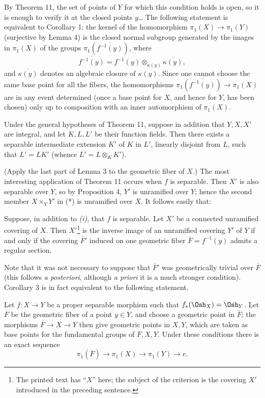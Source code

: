 By Theorem 11, the set of points of $Y$ for which this condition holds is open,
so it is enough to verify it at the closed points $y$\ldots{} The following
statement is equivalent to Corollary 1: the kernel of the homomorphism
$\pi_1(X)\longrightarrow\pi_1(Y)$ (surjective by Lemma 4) is the closed normal
subgroup generated by the images in $\pi_1(X)$ of the groups
$\pi_1(\overline{f^{-1}(y)})$, where
\[
  \overline{f^{-1}(y)}
  =f^{-1}(y)\otimes_{\kappa(y)}\overline{\kappa(y)},
\]
and $\overline{\kappa(y)}$ denotes an algebraic closure of $\kappa(y)$. Since
one cannot choose the same base point for all the fibers, the homomorphisms
$\pi_1(\overline{f^{-1}(y)})\longrightarrow\pi_1(X)$ are in any event
determined (once a base point for $X$, and hence for $Y$, has been chosen) only
up to composition with an inner automorphism of $\pi_1(X)$.

 Under the general hypotheses of Theorem 11, suppose in
addition that $Y,X,X'$ are integral, and let $K,L,L'$ be their function fields.
Then there exists a separable intermediate extension $K'$ of $K$ in $L'$,
linearly disjoint from $L$, such that $L'=LK'$ (whence
$L'=L\otimes_K K'$).

(Apply the last part of Lemma 3 to the geometric fiber of $X$.) The most
interesting application of Theorem 11 occurs when $f$ is separable. Then $X'$
is also separable over $Y$, so by Proposition 4, $Y'$ is unramified over $Y$;
hence the second member $X\times_Y Y'$ in (*) is unramified over $X$. It
follows easily that:

 Suppose, in addition to \textit{(i)}, that $f$ is
separable. Let $X'$ be a connected unramified covering of $X$. Then $X'$\footnote{The
printed text has “$X$” here; the subject of the criterion is the covering $X'$
introduced in the preceding sentence.} is
the inverse image of an unramified covering $Y'$ of $Y$ if and only if the
covering $\overline F'$ induced on one geometric fiber
$\overline F=f^{-1}(y)$ admits a regular section.

Note that it was not necessary to suppose that $\overline F'$ was
geometrically trivial over $\overline F$ (this follows \textit{a posteriori},
although \textit{a priori} it is a much stronger condition). Corollary 3 is in
fact equivalent to the following statement.

 Let $f:X\longrightarrow Y$ be a proper separable
morphism such that $f_*(\Osh_X)=\Osh_Y$. Let $\overline F$ be the geometric
fiber of a point $y\in Y$, and choose a geometric point in $\overline F$; the
morphisms $\overline F\longrightarrow X\longrightarrow Y$ then give geometric
points in $X,Y$, which are taken as base points for the fundamental groups of
$\overline F,X,Y$. Under these conditions there is an exact sequence
\[
  \boxed{
    \pi_1(\overline F)\longrightarrow\pi_1(X)
    \longrightarrow\pi_1(Y)\longrightarrow e
  }.
\]

